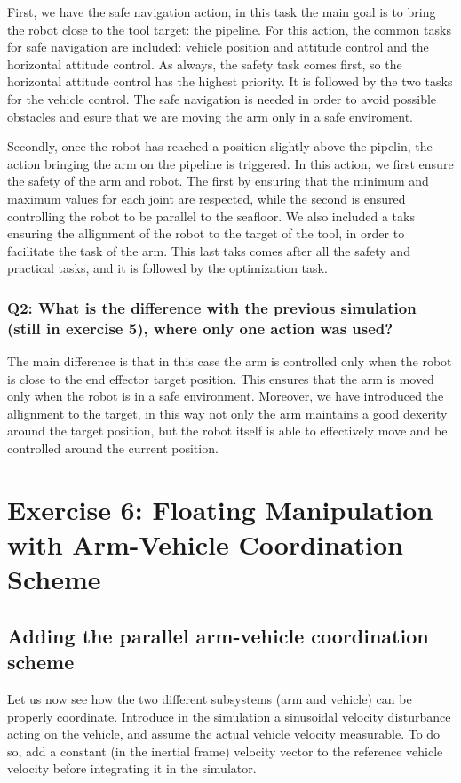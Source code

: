 \documentclass{article}
\begin{document}
First, we have the safe navigation action, in this task the main goal is to bring the robot close to the tool target: the pipeline. For this action, the common tasks for safe navigation are included: vehicle position and attitude control and the horizontal attitude control. As always, the safety task comes first, so the horizontal attitude control has the highest priority. It is followed by the two tasks for the vehicle control. The safe navigation is needed in order to avoid possible obstacles and esure that we are moving the arm only in a safe enviroment. 

Secondly, once the robot has reached a position slightly above the pipelin, the action bringing the arm on the pipeline is triggered. In this action, we first ensure the safety of the arm and robot. The first by ensuring that the minimum and maximum values for each joint are respected, while the second is ensured controlling the robot to be parallel to the seafloor. We also included a taks ensuring the allignment of the robot to the target of the tool, in order to facilitate the task of the arm. This last taks comes after all the safety and practical tasks, and it is followed by the optimization task. 

\subsubsection{Q2: What is the difference with the previous simulation (still in exercise 5), where only one action was used?}

The main difference is that in this case the arm is controlled only when the robot is close to the end effector target position. This ensures that the arm is moved only when the robot is in a safe environment. 
Moreover, we have introduced the allignment to the target, in this way not only the arm maintains a good dexerity around the target position, but the robot itself is able to effectively move and be controlled around the current position. 
\clearpage
\section{Exercise 6: Floating Manipulation with Arm-Vehicle Coordination Scheme}
\subsection{Adding the parallel arm-vehicle coordination scheme}
Let us now see how the two different subsystems (arm and vehicle) can be properly coordinate. Introduce in the simulation a sinusoidal velocity disturbance acting on the vehicle, and assume the actual vehicle velocity measurable. To do so, add a constant (in the inertial frame) velocity vector to the reference vehicle velocity before integrating it in the simulator.
\end{document}
